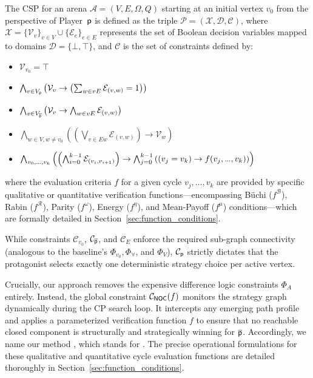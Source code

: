 \documentclass[a4paper,fleqn]{cas-sc}
\begin{document}
\begin{definition}\label{def:csp}
The CSP for an arena $\mathcal{A} = (V, E, \Omega, Q)$ starting at an initial vertex $v_0$ from the perspective of Player~$\mathsf{p}$ is defined as the triple $\mathcal{P} = (\mathcal{X}, \mathcal{D}, \mathcal{C})$, where $\mathcal{X} = \{ \mathcal{V}_v \}_{v \in V} \cup \{ \mathcal{E}_e \}_{e \in E}$ represents the set of Boolean decision variables mapped to domains $\mathcal{D} = \{\bot, \top\}$, and $\mathcal{C}$ is the set of constraints defined by:
\begin{itemize}
    [leftmargin=2.3cm, labelwidth=2.8cm, align=right, itemsep=1.0ex, parsep=0pt]
    \item [$\mathcal{C}_{v_0}$ :] $\mathcal{V}_{v_0} = \top$
    \item [$\mathcal{C}_{\player}$ :] $\bigwedge_{v \in V_{\mathsf{p}}} \left(\mathcal{V}_v \rightarrow \left(\sum_{w \in vE} \mathcal{E}_{(v,w)}= 1\right)\right)$
    \item [$\mathcal{C}_{\opponent}$ :] $\bigwedge_{v \in V_{\overline{\mathsf{p}}}} \left(\mathcal{V}_v \rightarrow \bigwedge_{w \in vE} \mathcal{E}_{(v,w)}\right)$
    \item [$\mathcal{C}_{\!E}$ :] $\bigwedge_{w \in V, w \neq v_0} \left(\left(\bigvee_{v \in Ew} \mathcal{E}_{(v,w)}\right) \rightarrow \mathcal{V}_w\right)$
    \item [$\mathcal{C}_{\noc}(f)$ :] $\bigwedge_{v_0, .\kern-0.05em.\kern-0.05em., v_k} \left( \left(\bigwedge_{i=0}^{k-1} \mathcal{E}_{(v_i,v_{i+1})}\right) \to \bigwedge_{j=0}^{k-1} \left((v_j = v_k) \to f(v_j, .\kern-0.05em.\kern-0.05em., v_k)\right) \right)$
\end{itemize}
where the evaluation criteria $f$ for a given cycle $v_j, \dots, v_k$ are provided by specific qualitative or quantitative verification functions—encompassing Büchi ($f^\mathcal{B}$), Rabin ($f^\mathcal{R}$), Parity ($f^\omega$), Energy ($f^\eta$), and Mean-Payoff ($f^\mu$) conditions—which are formally detailed in Section~\ref{sec:function_conditions}.

\end{definition}

While constraints $\mathcal{C}_{v_0}$, $\mathcal{C}_{\opponent}$, and $\mathcal{C}_{\!E}$ enforce the required sub-graph connectivity (analogous to the baseline's $\Phi_{v_0}, \Phi_\forall$, and $\Phi_V$), $\mathcal{C}_{\player}$ strictly dictates that the protagonist selects exactly one deterministic strategy choice per active vertex. 

Crucially, our approach removes the expensive difference logic constraints $\Phi_A$ entirely. Instead, the global constraint $\mathcal{C}_{\noc}(f)$ monitors the strategy graph dynamically during the CP search loop. It intercepts any emerging path profile and applies a parameterized verification function $f$ to ensure that no reachable closed component is structurally and strategically winning for $\overline{\mathsf{p}}$. Accordingly, we name our method \noc, which stands for \nooppc. The precise operational formulations for these qualitative and quantitative cycle evaluation functions are detailed thoroughly in Section~\ref{sec:function_conditions}.
\end{document}
